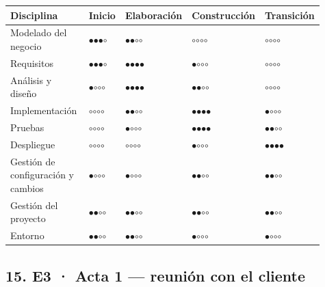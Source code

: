 {\footnotesize\setlength{\tabcolsep}{4pt}
\begin{longtable}{@{}>{\raggedright\arraybackslash}p{0.389\linewidth}>{\raggedright\arraybackslash}p{0.079\linewidth}>{\raggedright\arraybackslash}p{0.147\linewidth}>{\raggedright\arraybackslash}p{0.166\linewidth}>{\raggedright\arraybackslash}p{0.133\linewidth}@{}}
\toprule
\textbf{Disciplina} & \textbf{Inicio} & \textbf{Elaboración} & \textbf{Construcción} & \textbf{Transición} \\
\midrule
\endhead
Modelado del negocio & $\bullet$$\bullet$$\bullet$$\circ$ & $\bullet$$\bullet$$\circ$$\circ$ & $\circ$$\circ$$\circ$$\circ$ & $\circ$$\circ$$\circ$$\circ$ \\
Requisitos & $\bullet$$\bullet$$\bullet$$\circ$ & $\bullet$$\bullet$$\bullet$$\bullet$ & $\bullet$$\circ$$\circ$$\circ$ & $\circ$$\circ$$\circ$$\circ$ \\
Análisis y diseño & $\bullet$$\circ$$\circ$$\circ$ & $\bullet$$\bullet$$\bullet$$\bullet$ & $\bullet$$\bullet$$\circ$$\circ$ & $\circ$$\circ$$\circ$$\circ$ \\
Implementación & $\circ$$\circ$$\circ$$\circ$ & $\bullet$$\bullet$$\circ$$\circ$ & $\bullet$$\bullet$$\bullet$$\bullet$ & $\bullet$$\circ$$\circ$$\circ$ \\
Pruebas & $\circ$$\circ$$\circ$$\circ$ & $\bullet$$\circ$$\circ$$\circ$ & $\bullet$$\bullet$$\bullet$$\bullet$ & $\bullet$$\bullet$$\circ$$\circ$ \\
Despliegue & $\circ$$\circ$$\circ$$\circ$ & $\circ$$\circ$$\circ$$\circ$ & $\bullet$$\circ$$\circ$$\circ$ & $\bullet$$\bullet$$\bullet$$\bullet$ \\
Gestión de configuración y cambios & $\bullet$$\circ$$\circ$$\circ$ & $\bullet$$\circ$$\circ$$\circ$ & $\bullet$$\bullet$$\circ$$\circ$ & $\bullet$$\bullet$$\circ$$\circ$ \\
Gestión del proyecto & $\bullet$$\bullet$$\circ$$\circ$ & $\bullet$$\bullet$$\circ$$\circ$ & $\bullet$$\bullet$$\circ$$\circ$ & $\bullet$$\bullet$$\circ$$\circ$ \\
Entorno & $\bullet$$\bullet$$\circ$$\circ$ & $\bullet$$\bullet$$\circ$$\circ$ & $\bullet$$\circ$$\circ$$\circ$ & $\bullet$$\circ$$\circ$$\circ$ \\
\bottomrule
\end{longtable}}

\subsection*{15. E3 · Acta 1 — reunión con el cliente}


